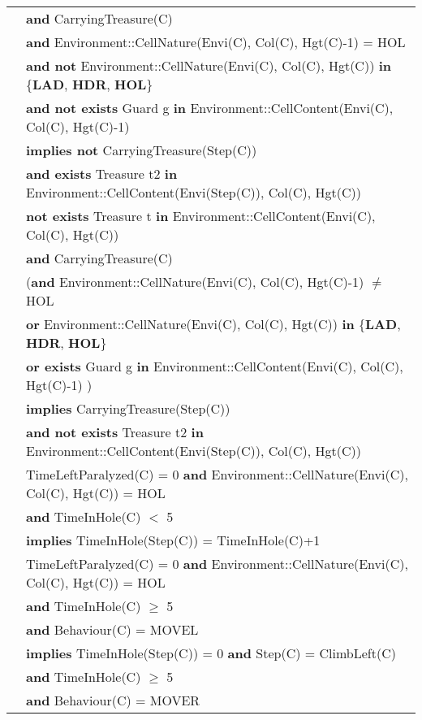 \documentclass[7pt]{article}
\begin{document}
\begin{tabular}{rl}
& \quad \textbf{and} CarryingTreasure(C) \\
& \quad \textbf{and} Environment::CellNature(Envi(C), Col(C), Hgt(C)-1) = HOL \\
& \quad \textbf{and not} Environment::CellNature(Envi(C), Col(C), Hgt(C)) \textbf{in} \{\textbf{LAD}, \textbf{HDR}, \textbf{HOL}\} \\
&\quad \textbf{and not exists} Guard g \textbf{in} Environment::CellContent(Envi(C), Col(C), Hgt(C)-1) \\ 
& \quad \textbf{implies not} CarryingTreasure(Step(C)) \\
& \quad\quad \textbf{and exists} Treasure t2 \textbf{in} Environment::CellContent(Envi(Step(C)), Col(C), Hgt(C)) \\
& \textbf{not exists} Treasure t \textbf{in} Environment::CellContent(Envi(C), Col(C), Hgt(C)) \\ 
& \quad \textbf{and} CarryingTreasure(C) \\
& \quad (\textbf{and} Environment::CellNature(Envi(C), Col(C), Hgt(C)-1) $\neq$ HOL \\
& \quad\quad \textbf{or} Environment::CellNature(Envi(C), Col(C), Hgt(C)) \textbf{in} \{\textbf{LAD}, \textbf{HDR}, \textbf{HOL}\} \\
&\quad\quad \textbf{or exists} Guard g \textbf{in} Environment::CellContent(Envi(C), Col(C), Hgt(C)-1) )\\ 
& \quad \textbf{implies} CarryingTreasure(Step(C)) \\
& \quad\quad \textbf{and not exists} Treasure t2 \textbf{in} Environment::CellContent(Envi(Step(C)), Col(C), Hgt(C)) \\
& TimeLeftParalyzed(C) = 0 \textbf{and} Environment::CellNature(Envi(C), Col(C), Hgt(C)) = HOL \\
& \quad \textbf{and} TimeInHole(C) $<$ 5 \\
& \quad \textbf{implies} TimeInHole(Step(C)) = TimeInHole(C)+1 \\
& TimeLeftParalyzed(C) = 0 \textbf{and} Environment::CellNature(Envi(C), Col(C), Hgt(C)) = HOL \\
& \quad \textbf{and} TimeInHole(C) $\geq$  5 \\
& \quad \textbf{and} Behaviour(C) = MOVEL \\
& \quad \textbf{implies} TimeInHole(Step(C)) = 0 \textbf{and} Step(C) = ClimbLeft(C) \\
& \quad \textbf{and} TimeInHole(C) $\geq$  5 \\
& \quad \textbf{and} Behaviour(C) = MOVER \\

\end{tabular}
\end{document}
